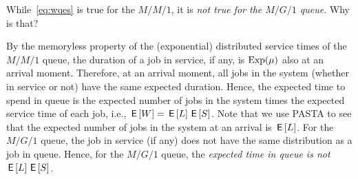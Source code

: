 \documentclass[stochastic-or.tex]{subfiles}
\begin{document}
\begin{exercise}\label{ex:l-216}
While~\cref{eq:wqes} is true for the $M/M/1$, it is \emph{not true for the $M/G/1$ queue}. Why is that?
\begin{solution}
 By the memoryless property of the (exponential) distributed service times of the $M/M/1$ queue, the duration of a job in service, if any, is $\mathrm{Exp}(\mu)$ also at an arrival moment.
 Therefore, at an arrival moment, all jobs in the system (whether in service or not) have the same expected duration.
 Hence, the expected time to spend in queue is the expected number of jobs in the system times the expected service time of each job, i.e., $\,\mathsf{E}\left[W\right] = \,\mathsf{E}\left[L\right] \,\mathsf{E}\left[S\right]$.
 Note that we use PASTA to see that the expected number of jobs in the system at an arrival is $\,\mathsf{E}\left[L\right]$.
 For the $M/G/1$ queue, the job in service (if any) does not have the same distribution as a job in queue.
 Hence, for the $M/G/1$ queue, the \emph{expected time in queue is not} $\,\mathsf{E}\left[L\right] \,\mathsf{E}\left[S\right]$.
\end{solution}
\end{exercise}



\end{document}
